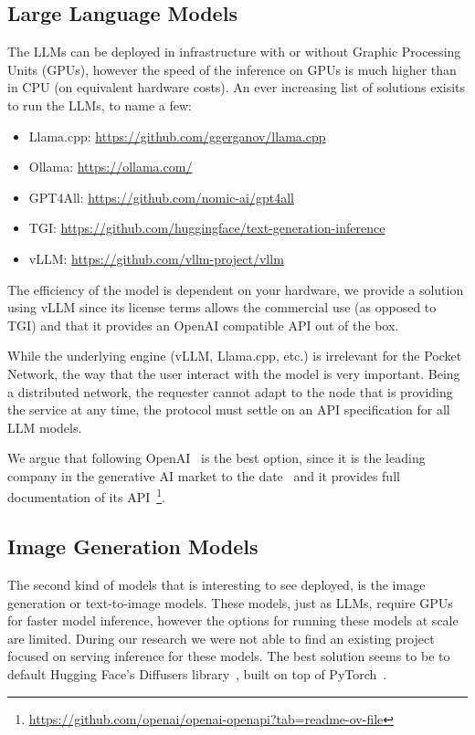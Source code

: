 \subsection{Large Language Models}
The LLMs can be deployed in infrastructure with or without Graphic Processing Units (GPUs), however the speed of the inference on GPUs is much higher than in CPU (on equivalent hardware costs). An ever increasing list of solutions exisits to run the LLMs, to name a few:
\begin{itemize}
    \item Llama.cpp: \url{https://github.com/ggerganov/llama.cpp}
    \item Ollama: \url{https://ollama.com/}
    \item GPT4All: \url{https://github.com/nomic-ai/gpt4all}
    \item TGI: \url{https://github.com/huggingface/text-generation-inference}
    \item vLLM: \url{https://github.com/vllm-project/vllm}
\end{itemize}
The efficiency of the model is dependent on your hardware, we provide a solution using vLLM since its license terms allows the commercial use (as opposed to TGI) and that it provides an OpenAI compatible API out of the box.

While the underlying engine (vLLM, Llama.cpp, etc.) is irrelevant for the Pocket Network, the way that the user interact with the model is very important. Being a distributed network, the requester cannot adapt to the node that is providing the service at any time, the protocol must settle on an API specification for all LLM models. 

We argue that following OpenAI~\cite{openAI_API} is the best option, since it is the leading company in the generative AI market to the date~\cite{generative_ai_market} and it provides full documentation of its API~\footnote{\url{https://github.com/openai/openai-openapi?tab=readme-ov-file}}.
 
\subsection{Image Generation Models}
The second kind of models that is interesting to see deployed, is the image generation or text-to-image models. These models, just as LLMs, require GPUs for faster model inference, however the options for running these models at scale are limited. 
During our research we were not able to find an existing project focused on serving inference for these models. The best solution seems to be to default Hugging Face's Diffusers library~\cite{hf_diffusers}, built on top of PyTorch~\cite{paszke2017automatic}. 


